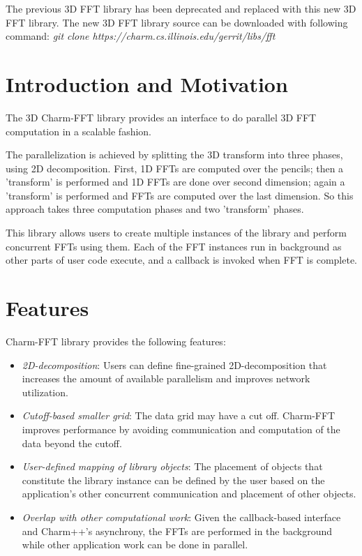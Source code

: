 The previous 3D FFT library has been deprecated and replaced with this new 3D FFT library.
The new 3D FFT library source can be downloaded with following command:
\textit{git clone https://charm.cs.illinois.edu/gerrit/libs/fft}

\section{Introduction and Motivation}
The 3D Charm-FFT library provides an interface to do parallel 3D FFT computation
in a scalable fashion.

\noindent The parallelization is achieved by splitting the 3D transform into
three phases, using 2D decomposition. First, 1D FFTs are computed over
the pencils; then a 'transform' is performed and 1D FFTs are done over
second dimension; again a 'transform' is performed and FFTs are computed
over the last dimension. So this approach takes three computation phases
and two 'transform' phases.

\noindent This library allows users to create multiple instances of the library
and perform concurrent FFTs using them. Each of the FFT instances run in
background as other parts of user code execute, and a callback is invoked
when FFT is complete.

\section{Features}
Charm-FFT library provides the following features:

\begin{itemize}
\item \textit{2D-decomposition}: Users can define fine-grained 2D-decomposition
that increases the amount of available parallelism and improves network utilization.
\item \textit{Cutoff-based smaller grid}: The data grid may have a cut off.
Charm-FFT improves performance by avoiding communication and computation of the data
beyond the cutoff.
\item \textit{User-defined mapping of library objects}: The placement of objects
that constitute the library instance can be defined by the user based on the application's
other concurrent communication and placement of other objects.
\item \textit{Overlap with other computational work}: Given the callback-based interface
and Charm++'s asynchrony, the FFTs are performed in the background while other application
work can be done in parallel.
\end{itemize}

